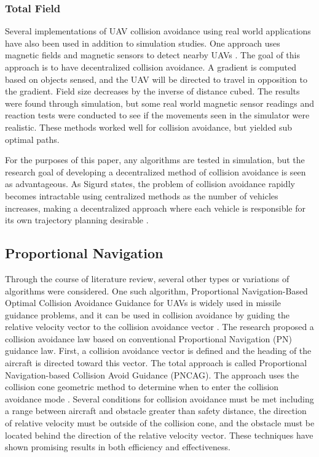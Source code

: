 \documentclass[10pt, conference, compsocconf]{IEEEtran}
\begin{document}
\subsubsection{Total Field}
Several implementations of UAV collision avoidance using real world applications have also been used in addition to simulation studies. One approach uses magnetic fields and magnetic sensors to detect nearby UAVs \cite{sigurd2003uav}. The goal of this approach is to have decentralized collision avoidance. A gradient is computed based on objects sensed, and the UAV will be directed to travel in opposition to the gradient. Field size decreases by the inverse of distance cubed. The results were found through simulation, but some real world magnetic sensor readings and reaction tests were conducted to see if the movements seen in the simulator were realistic. These methods worked well for collision avoidance, but yielded sub optimal paths. 

For the purposes of this paper, any algorithms are tested in simulation, but the research goal of developing a decentralized method of collision avoidance is seen as advantageous.  As Sigurd states, the problem of collision avoidance rapidly becomes intractable using centralized methods as the number of vehicles increases, making a decentralized approach where each vehicle is responsible for its own trajectory planning desirable \cite{sigurd2003uav}.

\subsection{Proportional Navigation}
Through the course of literature review, several other types or variations of algorithms were considered. One such algorithm, Proportional Navigation-Based Optimal Collision Avoidance Guidance for UAVs is widely used in missile guidance problems, and it can be used in collision avoidance by guiding the relative velocity vector to the collision avoidance vector \cite{han2004proportional}. The research proposed a collision avoidance law based on conventional Proportional Navigation (PN) guidance law. First, a collision avoidance vector is defined and the heading of the aircraft is directed toward this vector. The total approach is called Proportional Navigation-based Collision Avoid Guidance (PNCAG). The approach uses the collision cone geometric method  to determine when to enter the collision avoidance mode \cite{chakravarthy1998obstacle}. Several conditions for collision avoidance must be met including a range between aircraft and obstacle greater than safety distance, the direction of relative velocity must be outside of the collision cone, and the obstacle must be located behind the direction of the relative velocity vector. These techniques have shown promising results in both efficiency and effectiveness.
\end{document}
